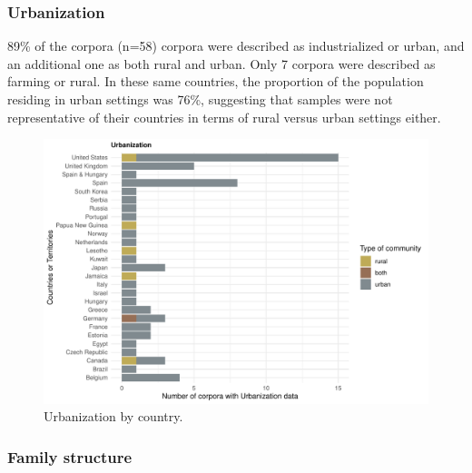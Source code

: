 \documentclass[
  man,floatsintext]{apa6}
\begin{document}
\hypertarget{urbanization-1}{%
\subsubsection{Urbanization}\label{urbanization-1}}

89\% of the corpora (n=58) corpora were described as industrialized or urban, and an additional one as both rural and urban. Only 7 corpora were described as farming or rural. In these same countries, the proportion of the population residing in urban settings was 76\%, suggesting that samples were not representative of their countries in terms of rural versus urban settings either.

\begin{figure}
\centering
\includegraphics{CHILDES_short_files/figure-latex/figure4-1.pdf}
\caption{\label{fig:figure4}Urbanization by country.}
\end{figure}

\hypertarget{family-structure-1}{%
\subsubsection{Family structure}\label{family-structure-1}}
\end{document}
